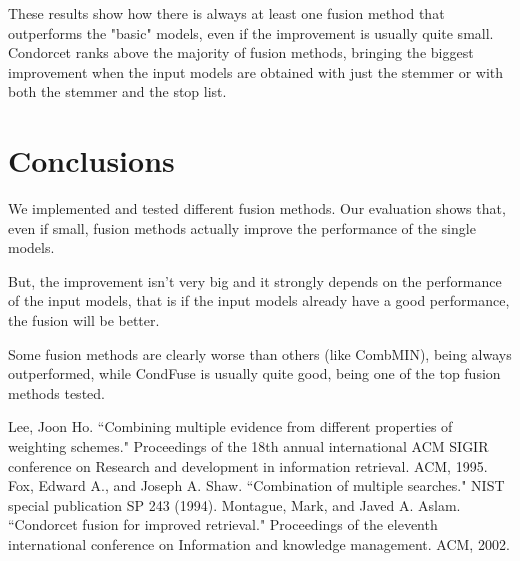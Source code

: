 \hfill
	
	These results show how there is always at least one fusion method that outperforms the "basic" models, even if the improvement is usually quite small.
	Condorcet ranks above the majority of fusion methods, bringing the biggest improvement when the input models are obtained with just the stemmer or with both the stemmer and the stop list.	
	
	\section{Conclusions}
	We implemented and tested different fusion methods. Our evaluation shows that, even if small, fusion methods actually improve the performance of the single models.
	
	But, the improvement isn't very big and it strongly depends on the performance of the input models, that is if the input models already have a good performance, the fusion will be better.
	
	Some fusion methods are clearly worse than others (like CombMIN), being always outperformed, while CondFuse is usually quite good, being one of the top fusion methods tested.

	\begin{thebibliography}{1}
		Lee, Joon Ho. ``Combining multiple evidence from different properties of weighting schemes." Proceedings of the 18th annual international ACM SIGIR conference on Research and development in information retrieval. ACM, 1995.
		Fox, Edward A., and Joseph A. Shaw. ``Combination of multiple searches." NIST special publication SP 243 (1994).
		Montague, Mark, and Javed A. Aslam. ``Condorcet fusion for improved retrieval." Proceedings of the eleventh international conference on Information and knowledge management. ACM, 2002.
		
	\end{thebibliography}
	


